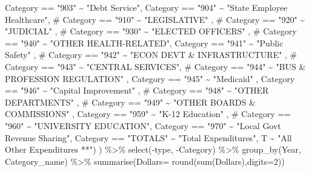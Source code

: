 \documentclass[
  letterpaper,
  DIV=11,
  numbers=noendperiod]{scrreport}
\newenvironment{Shaded}{\begin{snugshade}}{\end{snugshade}}
\newcommand{\AttributeTok}[1]{\textcolor[rgb]{0.40,0.45,0.13}{#1}}
\newcommand{\CommentTok}[1]{\textcolor[rgb]{0.37,0.37,0.37}{#1}}
\newcommand{\DecValTok}[1]{\textcolor[rgb]{0.68,0.00,0.00}{#1}}
\newcommand{\FunctionTok}[1]{\textcolor[rgb]{0.28,0.35,0.67}{#1}}
\newcommand{\NormalTok}[1]{\textcolor[rgb]{0.00,0.23,0.31}{#1}}
\newcommand{\SpecialCharTok}[1]{\textcolor[rgb]{0.37,0.37,0.37}{#1}}
\newcommand{\StringTok}[1]{\textcolor[rgb]{0.13,0.47,0.30}{#1}}
\begin{document}
\begin{Shaded}
\begin{Highlighting}[]
\NormalTok{             Category }\SpecialCharTok{==} \StringTok{"903"} \SpecialCharTok{\textasciitilde{}} \StringTok{"Debt Service"}\NormalTok{,}
\NormalTok{             Category }\SpecialCharTok{==} \StringTok{"904"} \SpecialCharTok{\textasciitilde{}} \StringTok{"State Employee Healthcare"}\NormalTok{,}
           \CommentTok{\#  Category == "910" \textasciitilde{} "LEGISLATIVE"  ,}
          \CommentTok{\#   Category == "920" \textasciitilde{} "JUDICIAL" ,}
          \CommentTok{\#   Category == "930" \textasciitilde{} "ELECTED OFFICERS" , }
            \CommentTok{\# Category == "940" \textasciitilde{} "OTHER HEALTH{-}RELATED", }
\NormalTok{             Category }\SpecialCharTok{==} \StringTok{"941"} \SpecialCharTok{\textasciitilde{}} \StringTok{"Public Safety"}\NormalTok{ ,}
           \CommentTok{\#  Category == "942" \textasciitilde{} "ECON DEVT \& INFRASTRUCTURE" ,}
           \CommentTok{\#  Category == "943" \textasciitilde{} "CENTRAL SERVICES",}
           \CommentTok{\#  Category == "944" \textasciitilde{} "BUS \& PROFESSION REGULATION" ,}
\NormalTok{             Category }\SpecialCharTok{==} \StringTok{"945"} \SpecialCharTok{\textasciitilde{}} \StringTok{"Medicaid"}\NormalTok{ ,}
\NormalTok{             Category }\SpecialCharTok{==} \StringTok{"946"} \SpecialCharTok{\textasciitilde{}} \StringTok{"Capital Improvement"}\NormalTok{ , }
           \CommentTok{\#  Category == "948" \textasciitilde{} "OTHER DEPARTMENTS" ,}
            \CommentTok{\# Category == "949" \textasciitilde{} "OTHER BOARDS \& COMMISSIONS" ,}
\NormalTok{             Category }\SpecialCharTok{==} \StringTok{"959"} \SpecialCharTok{\textasciitilde{}} \StringTok{"K{-}12 Education"}\NormalTok{ ,}
           \CommentTok{\#  Category == "960" \textasciitilde{} "UNIVERSITY EDUCATION",}
\NormalTok{             Category }\SpecialCharTok{==} \StringTok{"970"} \SpecialCharTok{\textasciitilde{}} \StringTok{"Local Govt Revenue Sharing"}\NormalTok{,}
\NormalTok{          Category }\SpecialCharTok{==} \StringTok{"TOTALS"} \SpecialCharTok{\textasciitilde{}} \StringTok{"Total Expenditures"}\NormalTok{,}
\NormalTok{             T }\SpecialCharTok{\textasciitilde{}} \StringTok{"All Other Expenditures **"}\NormalTok{)}
\NormalTok{           ) }\SpecialCharTok{\%\textgreater{}\%} 
  \FunctionTok{select}\NormalTok{(}\SpecialCharTok{{-}}\NormalTok{type, }\SpecialCharTok{{-}}\NormalTok{Category) }\SpecialCharTok{\%\textgreater{}\%} 
  \FunctionTok{group\_by}\NormalTok{(Year, Category\_name) }\SpecialCharTok{\%\textgreater{}\%} 
  \FunctionTok{summarise}\NormalTok{(}\AttributeTok{Dollars=} \FunctionTok{round}\NormalTok{(}\FunctionTok{sum}\NormalTok{(Dollars),}\AttributeTok{digits=}\DecValTok{2}\NormalTok{))}


\end{Highlighting}
\end{Shaded}
\end{document}
